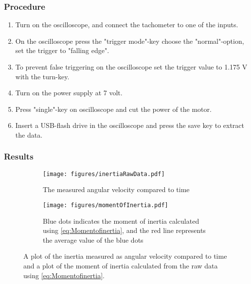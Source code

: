 \subsubsection{Procedure}

\begin{enumerate}
  \item Turn on the oscilloscope, and connect the tachometer to one of the inputs.
  \item On the oscilloscope press the "trigger mode"-key choose the "normal"-option, set the trigger to "falling edge".
  \item To prevent false triggering on the oscilloscope set the trigger value to \num{1,175} V with the turn-key.
  \item Turn on the power supply at 7 volt.
  \item Press "single"-key on oscilloscope and cut the power of the motor.
  \item Insert a USB-flash drive in the oscilloscope and press the save key to extract the data.
\end{enumerate}

\subsubsection{Results}

\begin{figure}[H]
  \setcounter{subfigure}{0}
  \centering
  \begin{subfigure}{0.45\textwidth}
    \centering
    \texttt{[image: figures/inertiaRawData.pdf]}
    \caption{The measured angular velocity compared to time}
    \label{inertiaRawData}
  \end{subfigure}
  \begin{subfigure}{0.45\textwidth}
    \centering
    \texttt{[image: figures/momentOfInertia.pdf]}
    \caption{Blue dots indicates the moment of inertia calculated using \eqref{eq:Momentofinertia}, and the red line represents the average value of the blue dots}
  	\label{momentOfInertia}
  \end{subfigure}
  \caption{A plot of the inertia measured as angular velocity compared to time and a plot of the moment of inertia calculated from the raw data using \eqref{eq:Momentofinertia}.}
  \label{yo}
\end{figure}

